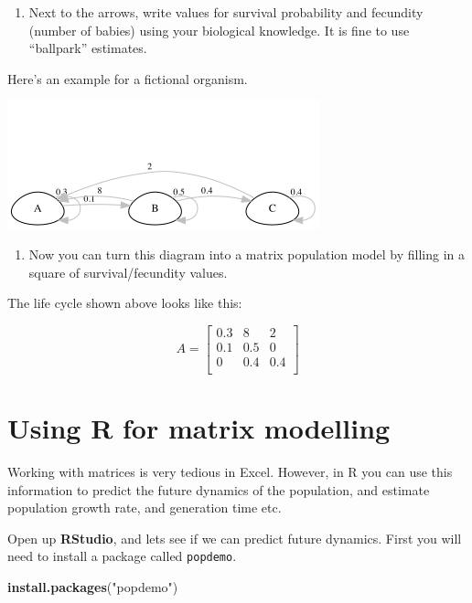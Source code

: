 \documentclass[
  a4paper]{book}
\newenvironment{Shaded}{\begin{snugshade}}{\end{snugshade}}
\newcommand{\FunctionTok}[1]{\textcolor[rgb]{0.13,0.29,0.53}{\textbf{#1}}}
\newcommand{\NormalTok}[1]{#1}
\newcommand{\StringTok}[1]{\textcolor[rgb]{0.31,0.60,0.02}{#1}}
\providecommand{\tightlist}{%
  \setlength{\itemsep}{0pt}\setlength{\parskip}{0pt}}
\begin{document}
\begin{enumerate}
\def\labelenumi{\arabic{enumi})}
\setcounter{enumi}{2}
\tightlist
\item
  Next to the arrows, write values for survival probability and fecundity (number of babies) using your biological knowledge. It is fine to use ``ballpark'' estimates.
\end{enumerate}

Here's an example for a fictional organism.

\includegraphics{tempLifeCycleDiagram.png}

\begin{enumerate}
\def\labelenumi{\arabic{enumi})}
\setcounter{enumi}{3}
\tightlist
\item
  Now you can turn this diagram into a matrix population model by filling in a square of survival/fecundity values.
\end{enumerate}

The life cycle shown above looks like this:

\[
A = \begin{bmatrix}0.3&8&2 \\0.1&0.5&0 \\0&0.4&0.4 \\\end{bmatrix}
\]

\hypertarget{using-r-for-matrix-modelling}{%
\section{Using R for matrix modelling}\label{using-r-for-matrix-modelling}}

Working with matrices is very tedious in Excel. However, in R you can use this information to predict the future dynamics of the population, and estimate population growth rate, and generation time etc.

Open up \textbf{RStudio}, and lets see if we can predict future dynamics. First you will need to install a package called \texttt{popdemo}.

\begin{Shaded}
\begin{Highlighting}[]
\FunctionTok{install.packages}\NormalTok{(}\StringTok{"popdemo"}\NormalTok{)}
\end{Highlighting}
\end{Shaded}
\end{document}
